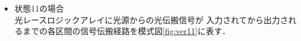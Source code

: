 \begin{itemize}
\item 状態11の場合\\
光レースロジックアレイに光源からの光伝搬信号が
入力されてから出力されるまでの各区間の信号伝搬経路を模式図\ref{fig:ver11}に表す．
\begin{figure}[t!]
\begin{center}
\end{center}
\end{figure}
\end{itemize}
